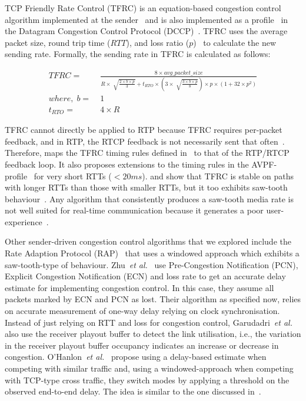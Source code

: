 TCP Friendly Rate Control (TFRC) is an equation-based congestion control
algorithm implemented at the sender~\cite{tfrc_347397} and is also implemented
as a profile~\cite{rfc4342} in the Datagram Congestion Control Protocol
(DCCP)~\cite{rfc4340}. TFRC uses the average packet size, round trip time
($RTT$), and loss ratio ($p$)~\cite{rfc3448} to calculate the new sending rate.
Formally, the sending rate in TFRC is calculated as follows:

\begin{align*}
 TFRC = &\; \frac{8 \times avg\_packet\_size}
{R \times \sqrt[]{\frac{2 \times b \times p}{3}} + t_{RTO} \times 
\left( 3 \times \sqrt[]{\frac{3 \times b \times p}{8}}\right) \times p \times
\left( 1+32 \times p^2 \right)}\\
where,\; b = &\; 1\\
t_{RTO} = &\; 4 \times R
\end{align*}

TFRC cannot directly be applied to RTP because TFRC requires per-packet
feedback, and in RTP, the RTCP feedback is not necessarily sent that
often~\cite{draft.rmcat.feedback}. Therefore, \cite{draft.rtp.tfrc} maps the
TFRC timing rules defined in~\cite{rfc4828, rfc5348} to that of the RTP/RTCP
feedback loop. It also proposes extensions to the timing rules in the
AVPF-profile~\cite{rfc4585} for very short RTTs ($<20ms$).
\cite{Gharai06:ICME} and \cite{VladBalan:2007dq} show that TFRC is stable on
paths with longer RTTs than those with smaller RTTs, but it too exhibits
saw-tooth behaviour~\cite{saurin:2006:thesis}. Any algorithm that consistently
produces a saw-tooth media rate is not well suited for real-time communication
because it generates a poor user-experience~\cite{Gharai:2002wt,
Zink03subjectiveimpression}.

Other sender-driven congestion control algorithms that we explored include the
Rate Adaption Protocol (RAP)~\cite{rap:752152} that uses a windowed approach which 
exhibits a saw-tooth-type of behaviour. Zhu~\textit{et
al.}~\cite{rmcat-nada} use Pre-Congestion Notification (PCN), Explicit
Congestion Notification (ECN) and loss rate to get an accurate delay
estimate for implementing congestion control. In this case, they assume all
packets marked by ECN and PCN as lost. Their algorithm as specified now, 
relies on accurate measurement of one-way delay relying on clock synchronisation.
Instead of just relying on RTT and loss for congestion control, 
Garudadri~\textit{et al.}~\cite{4397059} also use the
receiver playout buffer to detect the link utilisation, i.e., the variation in the 
receiver playout buffer occupancy indicates an increase or decrease in congestion.
O'Hanlon~\textit{et al.}~\cite{rmcat-dflow} propose using a delay-based
estimate when competing with similar traffic and, using a windowed-approach
when competing with TCP-type cross traffic, they switch modes by applying a
threshold on the observed end-to-end delay. The idea is similar to the one
discussed in~\cite{budzisz2011fair}.




